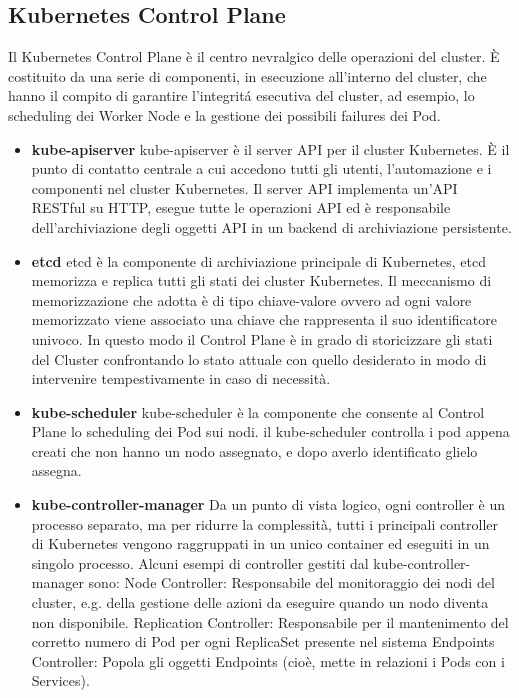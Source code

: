 \subsection{Kubernetes Control Plane}
Il Kubernetes Control Plane è il centro nevralgico delle operazioni del cluster. È costituito da una serie di componenti, in esecuzione all'interno del cluster, che hanno il compito di garantire l'integritá esecutiva del cluster, ad esempio, lo scheduling dei Worker Node e la gestione dei possibili failures dei Pod.
\begin{itemize}
    \item\textbf{kube-apiserver}
    kube-apiserver è il server API per il cluster Kubernetes. È il punto di contatto centrale a cui accedono tutti gli utenti, l'automazione e i componenti nel cluster Kubernetes. Il server API implementa un'API RESTful su HTTP, esegue tutte le operazioni API ed è responsabile dell'archiviazione degli oggetti API in un backend di archiviazione persistente. 
    \item\textbf{etcd}
    etcd è la componente di archiviazione principale di Kubernetes, etcd memorizza e replica tutti gli stati dei cluster Kubernetes. Il meccanismo di memorizzazione che adotta è di tipo chiave-valore ovvero ad ogni valore memorizzato viene associato una chiave che rappresenta il suo identificatore univoco. In questo modo il Control Plane è in grado di storicizzare gli stati del Cluster confrontando lo stato attuale con quello desiderato in modo di intervenire tempestivamente in caso di necessità.
    \item\textbf{kube-scheduler}
    kube-scheduler è la componente che consente al Control Plane lo scheduling dei Pod sui nodi. il kube-scheduler controlla i pod appena creati che non hanno un nodo assegnato, e dopo averlo identificato glielo assegna. 
    \item\textbf{kube-controller-manager} 
    Da un punto di vista logico, ogni controller è un processo separato, ma per ridurre la complessità, tutti i principali controller di Kubernetes vengono raggruppati in un unico container ed eseguiti in un singolo processo.
    Alcuni esempi di controller gestiti dal kube-controller-manager sono:
    Node Controller: Responsabile del monitoraggio dei nodi del cluster, e.g. della gestione delle azioni da eseguire quando un nodo diventa non disponibile.
    Replication Controller: Responsabile per il mantenimento del corretto numero di Pod per ogni ReplicaSet presente nel sistema
    Endpoints Controller: Popola gli oggetti Endpoints (cioè, mette in relazioni i Pods con i Services).

\end{itemize}
